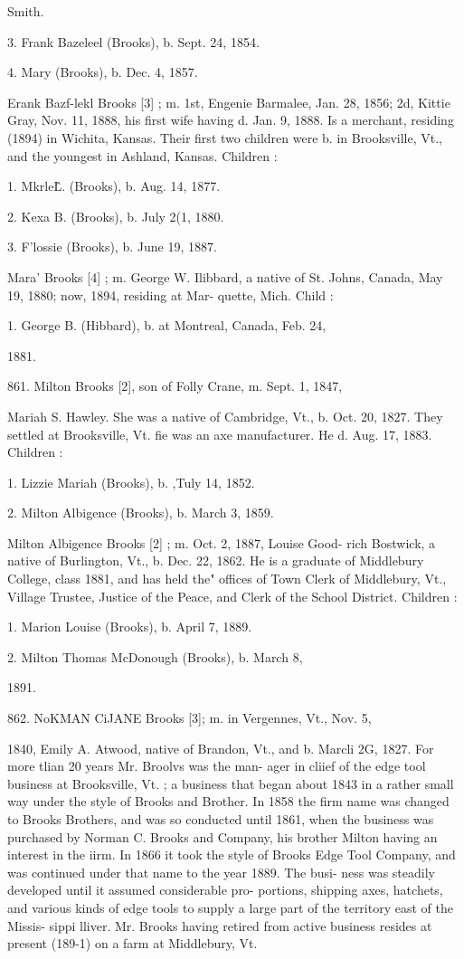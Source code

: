 Smith. 

3. Frank Bazeleel (Brooks), b. Sept. 24, 1854. 

4. Mary (Brooks), b. Dec. 4, 1857. 

Erank Bazf-lekl Brooks [3] ; m. 1st, Engenie Barmalee, Jan. 
28, 1856; 2d, Kittie Gray, Nov. 11, 1888, his first wife having 
d. Jan. 9, 1888. Is a merchant, residing (1894) in Wichita, 
Kansas. Their first two children were b. in Brooksville, Vt., 
and the youngest in Ashland, Kansas. Children : 

1. Mkrle\^L. (Brooks), b. Aug. 14, 1877. 

2. Kexa B. (Brooks), b. July 2(1, 1880. 

3. F'lossie (Brooks), b. June 19, 1887. 

Mara' Brooks [4] ; m. George W. Ilibbard, a native of St. 
Johns, Canada, May 19, 1880; now, 1894, residing at Mar- 
quette, Mich. Child : 

1. George B. (Hibbard), b. at Montreal, Canada, Feb. 24, 

1881. 

861. Milton Brooks [2], son of Folly Crane, m. Sept. 1, 1847, 

Mariah S. Hawley. She was a native of Cambridge, Vt., b. 
Oct. 20, 1827. They settled at Brooksville, Vt. fie was an 
axe manufacturer. He d. Aug. 17, 1883. Children : 

1. Lizzie Mariah (Brooks), b. ,Tuly 14, 1852. 

2. Milton Albigence (Brooks), b. March 3, 1859. 

Milton Albigence Brooks [2] ; m. Oct. 2, 1887, Louise Good- 
rich Bostwick, a native of Burlington, Vt., b. Dec. 22, 1862. 
He is a graduate of Middlebury College, class 1881, and has 
held the" offices of Town Clerk of Middlebury, Vt., Village 
Trustee, Justice of the Peace, and Clerk of the School District. 
Children : 

1. Marion Louise (Brooks), b. April 7, 1889. 

2. Milton Thomas McDonough (Brooks), b. March 8, 

1891. 




862. NoKMAN CiJANE Brooks [3]; m. in Vergennes, Vt., Nov. 5, 

1840, Emily A. Atwood, native of Brandon, Vt., and b. Marcli 
2G, 1827. For more tlian 20 years Mr. Broolvs was the man- 
ager in cliief of the edge tool business at Brooksville, Vt. ; a 
business that began about 1843 in a rather small way under 
the style of Brooks and Brother. In 1858 the firm name was 
changed to Brooks Brothers, and was so conducted until 1861, 
when the business was purchased by Norman C. Brooks and 
Company, his brother Milton having an interest in the iirm. 
In 1866 it took the style of Brooks Edge Tool Company, and 
was continued under that name to the year 1889. The busi- 
ness was steadily developed until it assumed considerable pro- 
portions, shipping axes, hatchets, and various kinds of edge 
tools to supply a large part of the territory east of the Missis- 
sippi lliver. Mr. Brooks having retired from active business 
resides at present (189-1) on a farm at Middlebury, Vt. 


